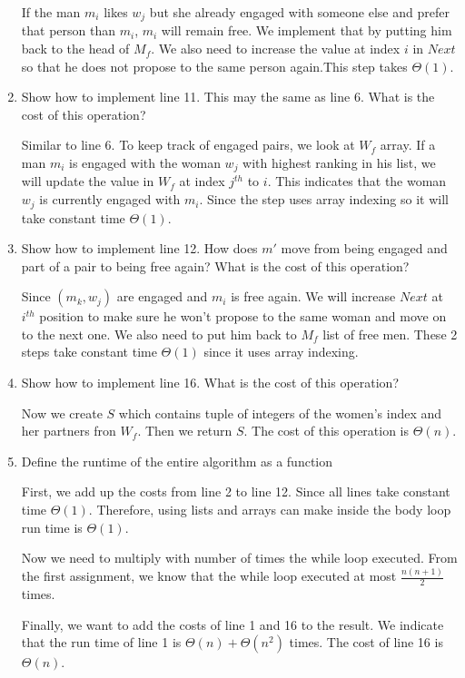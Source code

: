 \documentclass{cpsc413Solutions}
\begin{document}
\begin{problemlist}
\begin{problem}
\begin{answer}
\begin{enumerate}
    If the man $m_i$ likes $w_j$ but she already engaged with someone else and prefer that person than $m_i$, $m_i$ will remain free. We implement that by putting him back to the head of $M_f$. We also need to increase the value at index $i$ in $Next$ so that he does not propose to the same person again.This step takes $\Theta(1)$.
    
    \item Show how to implement line 11. This may the same as line 6. What is the cost of this operation? 
    
    Similar to line 6. To keep track of engaged pairs, we look at $W_f$ array. If a man $m_i$ is engaged with the woman $w_j$ with highest ranking in his list, we will update the value in $W_f$ at index $j^{th}$ to $i$. This indicates that the woman $w_j$ is currently engaged with $m_i$. Since the step uses array indexing so it will take constant time $\Theta(1)$.
    
    \item Show how to implement line 12. How does $m'$ move from being engaged and part of a pair to being free again? What is the cost of this operation?
    
    Since $(m_k,w_j)$ are engaged and $m_i$ is free again. We will increase $Next$ at $i^{th}$ position to make sure he won't propose to the same woman and move on to the next one. We also need to put him back to $M_f$ list of free men. These 2 steps take constant time $\Theta(1)$ since it uses array indexing.
    
    \item Show how to implement line 16. What is the cost of this operation?
    
    Now we create $S$ which contains tuple of integers of the women's index and her partners fron $W_f$. Then we return $S$.
    The cost of this operation is $\Theta(n)$.
    
    \item Define the runtime of the entire algorithm as a function
    
    First, we add up the costs from line 2 to line 12. Since all lines take constant time $\Theta(1)$. Therefore, using lists and arrays can make inside the body loop run time is $\Theta(1)$.
    
    Now we need to multiply with number of times the while loop executed. From the first assignment, we know that the while loop executed at most $\frac{n(n+1)}{2}$ times.
    
    Finally, we want to add the costs of line 1 and 16 to the result. We indicate that the run time of line 1 is $\Theta(n) + \Theta(n^2)$ times. The cost of line 16 is $\Theta(n)$. 
    

\end{enumerate}
\end{answer}
\end{problem}
\end{problemlist}
\end{document}
